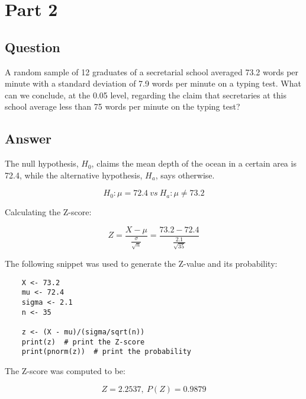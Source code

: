 \section{Part 2}
    \subsection{Question}
    A random sample of 12 graduates of a secretarial school averaged 73.2 words per minute with a standard deviation of 7.9 words per minute on a typing test. What can we conclude, at the 0.05 level, regarding the claim that secretaries at this school average less than 75 words per minute on the typing test?

    \subsection{Answer}
    The null hypothesis, $H_{0}$, claims the mean depth of the ocean in a certain area is 72.4, while the alternative hypothesis, $H_{a}$, says otherwise.

        \[ H_{0}: \mu = 72.4 \ vs \ H_{a}: \mu \neq 73.2 \]

    Calculating the Z-score:

        \[ Z = \frac{X-\mu}{\frac{\sigma}{\sqrt{n}}} = \frac{73.2-72.4}{\frac{2.1}{\sqrt{35}}} \]


    The following snippet was used to generate the Z-value and its probability:
\begin{lstlisting}
    X <- 73.2
    mu <- 72.4
    sigma <- 2.1
    n <- 35

    z <- (X - mu)/(sigma/sqrt(n))
    print(z)  # print the Z-score
    print(pnorm(z))  # print the probability
\end{lstlisting}

    The Z-score was computed to be:

        \[ Z=2.2537, \ P(Z) =0.9879 \]
